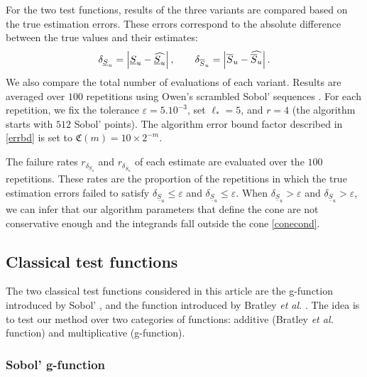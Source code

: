 For the two test functions, results of the three variants are compared based on the true estimation errors. These errors correspond to the absolute difference between the true values and their estimates:
$$\delta_{\underline{S}_u} = \left\lvert\underline{S}_u - \widehat{\underline{S}_u}\right\rvert, \qquad \delta_{\overline{S}_u} = \left\lvert\overline{S}_u - \widehat{\overline{S}_u}\right\rvert.$$
We also compare the total number of evaluations of each variant. Results are averaged over $100$ repetitions using Owen's scrambled Sobol' sequences \cite{HonHic00a,Owe95}. For each repetition, we fix the tolerance $\varepsilon=5.10^{-3}$, set $\ell_*=5$, and $r=4$ (the algorithm starts with $512$ Sobol' points). The algorithm error bound factor described in \eqref{errbd} is set to $\mathfrak{C}(m)=10\times 2^{-m}$.

The failure rates $r_{\delta_{\underline{S}_u}}$ and  $r_{\delta_{\overline{S}_u}}$ of each estimate are evaluated over the $100$ repetitions. These rates are the proportion of the repetitions in which the true estimation errors failed to satisfy $\delta_{\underline{S}_u} \leq \varepsilon$ and $\delta_{\underline{S}_u} \leq \varepsilon$. When $\delta_{\underline{S}_u} > \varepsilon$ and $\delta_{\underline{S}_u} > \varepsilon$, we can infer that our algorithm parameters that define the cone are not conservative enough and the integrands fall outside the cone \eqref{conecond}.

%

\subsection{Classical test functions}
\label{sec:5.1}

The two classical test functions considered in this article are the g-function introduced by Sobol' \cite{Sobol'}, and the function introduced by Bratley \textit{et al.} \cite{Bratley}. The idea is to test our method over two categories of functions: additive (Bratley \textit{et al.} function) and multiplicative (g-function).

\subsubsection{Sobol' g-function}

